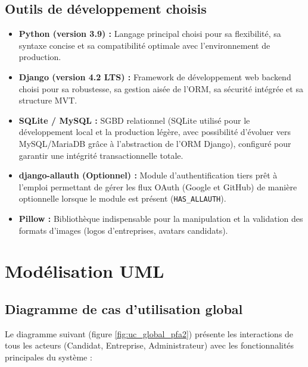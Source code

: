 \subsection{Outils de développement choisis}
\begin{itemize}
    \item \textbf{Python (version 3.9) :} Langage principal choisi pour sa flexibilité, sa syntaxe concise et sa compatibilité optimale avec l'environnement de production.
    \item \textbf{Django (version 4.2 LTS) :} Framework de développement web backend choisi pour sa robustesse, sa gestion aisée de l'ORM, sa sécurité intégrée et sa structure MVT.
    \item \textbf{SQLite / MySQL :} SGBD relationnel (SQLite utilisé pour le développement local et la production légère, avec possibilité d'évoluer vers MySQL/MariaDB grâce à l'abstraction de l'ORM Django), configuré pour garantir une intégrité transactionnelle totale.
    \item \textbf{django-allauth (Optionnel) :} Module d'authentification tiers prêt à l'emploi permettant de gérer les flux OAuth (Google et GitHub) de manière optionnelle lorsque le module est présent (\texttt{HAS\_ALLAUTH}).
    \item \textbf{Pillow :} Bibliothèque indispensable pour la manipulation et la validation des formats d'images (logos d'entreprises, avatars candidats).
\end{itemize}


\section{Modélisation UML}

\subsection{Diagramme de cas d'utilisation global}
Le diagramme suivant (figure \ref{fig:uc_global_pfa2}) présente les interactions de tous les acteurs (Candidat, Entreprise, Administrateur) avec les fonctionnalités principales du système :

